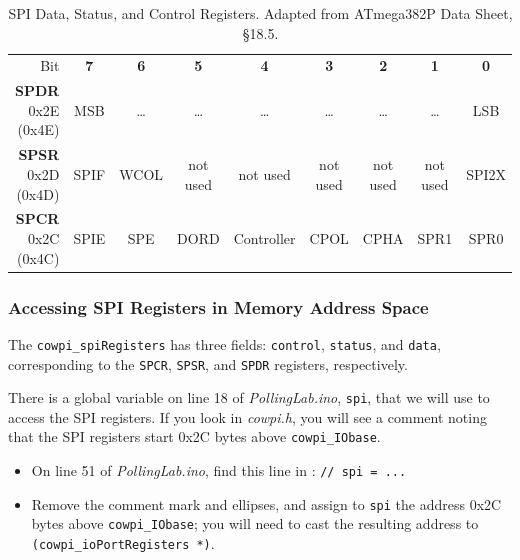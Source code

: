 \begin{table}
\centering \small
\begin{tabular}{|r||c|c|c|c|c|c|c|c||}
    \hline
    Bit                         & \textbf{7}    & \textbf{6}    & \textbf{5}    & \textbf{4}    & \textbf{3}    & \textbf{2}    & \textbf{1}    & \textbf{0}    \\ \cline{2-9} \cline{2-9}
    \textbf{SPDR} 0x2E (0x4E)   & MSB           & \dots         & \dots         & \dots         & \dots         & \dots         & \dots         & LSB           \\
    \textbf{SPSR} 0x2D (0x4D)   & SPIF          & WCOL          & not used      & not used      & not used      & not used      & not used      & SPI2X         \\
    \textbf{SPCR} 0x2C (0x4C)   & SPIE          & SPE           & DORD          & Controller    & CPOL          & CPHA          & SPR1          & SPR0          \\ \hline
\end{tabular}
\caption{SPI Data, Status, and Control Registers. \tiny Adapted from ATmega382P Data Sheet, §18.5. \label{table:SPIregisters}}
\end{table}

\subsubsection{Accessing SPI Registers in Memory Address Space}

The \lstinline{cowpi_spiRegisters} has three fields: \lstinline{control},
\lstinline{status}, and \lstinline{data}, corresponding to the \texttt{SPCR},
\texttt{SPSR}, and \texttt{SPDR} registers, respectively.



There is a global variable on line 18 of \textit{PollingLab.ino},
\lstinline{spi}, that we will use to access the SPI registers. If you look in
\textit{cowpi.h}, you will see a comment noting that the SPI registers start
0x2C bytes above \lstinline{cowpi_IObase}.



    \begin{itemize}
    \item On line 51 of \textit{PollingLab.ino}, find this line in
        : \lstinline{// spi = ...}
    \item Remove the comment mark and ellipses, and assign to \lstinline{spi}
        the address 0x2C bytes above \lstinline{cowpi_IObase}; you will need to
        cast the resulting address to \lstinline{(cowpi_ioPortRegisters *)}.
    \end{itemize}

